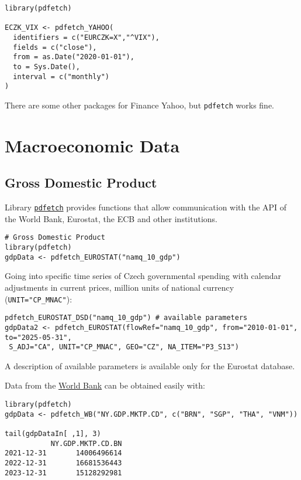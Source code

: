 \documentclass[10pt,a4paper]{article}
\begin{document}
\begin{figure}[!htbp]\centering
\end{figure}

\begin{lstlisting}
library(pdfetch)

ECZK_VIX <- pdfetch_YAHOO(
  identifiers = c("EURCZK=X","^VIX"),
  fields = c("close"),
  from = as.Date("2020-01-01"),
  to = Sys.Date(),
  interval = c("monthly")
)
\end{lstlisting}

There are some other packages for Finance Yahoo, but \texttt{pdfetch} works fine. 
\section*{Macroeconomic Data}

\subsection*{Gross Domestic Product}

Library \href{https://cran.r-project.org/web/packages/pdfetch/index.html}{\texttt{\textcolor{NavyBlue}{pdfetch}}} provides functions that allow communication with the API of the World Bank, Eurostat, the ECB and other institutions.

\begin{lstlisting}
# Gross Domestic Product
library(pdfetch)
gdpData <- pdfetch_EUROSTAT("namq_10_gdp")
\end{lstlisting}

Going into specific time series of Czech governmental spending with calendar adjustments in current prices, million units of national currency (\texttt{UNIT="CP\_MNAC"}):

\begin{lstlisting}
pdfetch_EUROSTAT_DSD("namq_10_gdp") # available parameters
gdpData2 <- pdfetch_EUROSTAT(flowRef="namq_10_gdp", from="2010-01-01", to="2025-05-31",
 S_ADJ="CA", UNIT="CP_MNAC", GEO="CZ", NA_ITEM="P3_S13")
\end{lstlisting}

A description of available parameters is available only for the Eurostat database. 

Data from the \href{https://data.worldbank.org/}{\textcolor{NavyBlue}{World Bank}} can be obtained easily with:

\begin{lstlisting}
library(pdfetch)
gdpData <- pdfetch_WB("NY.GDP.MKTP.CD", c("BRN", "SGP", "THA", "VNM"))

tail(gdpDataIn[ ,1], 3)
           NY.GDP.MKTP.CD.BN
2021-12-31       14006496614
2022-12-31       16681536443
2023-12-31       15128292981

\end{lstlisting}
\end{document}
